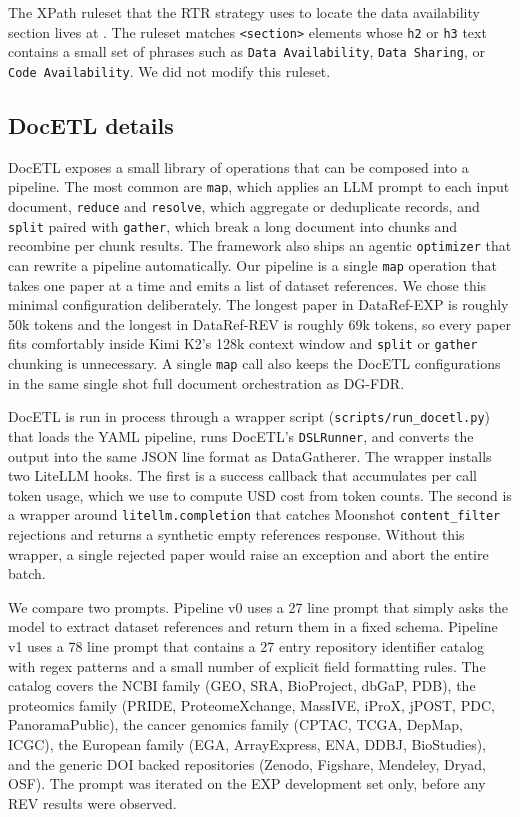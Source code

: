 \documentclass[sigconf,nonacm]{acmart}
\begin{document}
The XPath ruleset that the RTR strategy uses to locate the data availability section lives at . The ruleset matches \texttt{<section>} elements whose \texttt{h2} or \texttt{h3} text contains a small set of phrases such as \texttt{Data Availability}, \texttt{Data Sharing}, or \texttt{Code Availability}. We did not modify this ruleset.

\subsection{DocETL details}

DocETL exposes a small library of operations that can be composed into a pipeline. The most common are \texttt{map}, which applies an LLM prompt to each input document, \texttt{reduce} and \texttt{resolve}, which aggregate or deduplicate records, and \texttt{split} paired with \texttt{gather}, which break a long document into chunks and recombine per chunk results. The framework also ships an agentic \texttt{optimizer} that can rewrite a pipeline automatically. Our pipeline is a single \texttt{map} operation that takes one paper at a time and emits a list of dataset references. We chose this minimal configuration deliberately. The longest paper in DataRef-EXP is roughly 50k tokens and the longest in DataRef-REV is roughly 69k tokens, so every paper fits comfortably inside Kimi K2's 128k context window and \texttt{split} or \texttt{gather} chunking is unnecessary. A single \texttt{map} call also keeps the DocETL configurations in the same single shot full document orchestration as DG-FDR.

DocETL is run in process through a wrapper script (\texttt{scripts/run\_docetl.py}) that loads the YAML pipeline, runs DocETL's \texttt{DSLRunner}, and converts the output into the same JSON line format as DataGatherer. The wrapper installs two LiteLLM hooks. The first is a success callback that accumulates per call token usage, which we use to compute USD cost from token counts. The second is a wrapper around \texttt{litellm.completion} that catches Moonshot \texttt{content\_filter} rejections and returns a synthetic empty references response. Without this wrapper, a single rejected paper would raise an exception and abort the entire batch.

We compare two prompts. Pipeline v0 uses a 27 line prompt that simply asks the model to extract dataset references and return them in a fixed schema. Pipeline v1 uses a 78 line prompt that contains a 27 entry repository identifier catalog with regex patterns and a small number of explicit field formatting rules. The catalog covers the NCBI family (GEO, SRA, BioProject, dbGaP, PDB), the proteomics family (PRIDE, ProteomeXchange, MassIVE, iProX, jPOST, PDC, PanoramaPublic), the cancer genomics family (CPTAC, TCGA, DepMap, ICGC), the European family (EGA, ArrayExpress, ENA, DDBJ, BioStudies), and the generic DOI backed repositories (Zenodo, Figshare, Mendeley, Dryad, OSF). The prompt was iterated on the EXP development set only, before any REV results were observed.
\end{document}
